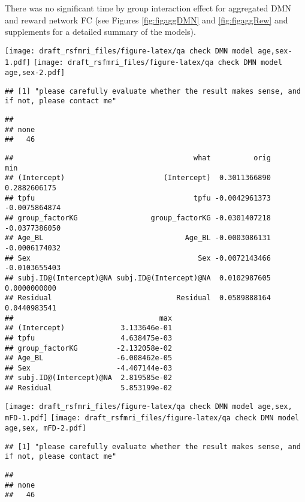 \documentclass[
]{article}
\begin{document}
There was no significant time by group interaction effect for aggregated DMN and reward network FC (see Figures \ref{fig:figaggDMN} and \ref{fig:figaggRew} and supplements for a detailed summary of the models).

\texttt{[image: draft\_rsfmri\_files/figure-latex/qa check DMN model age,sex-1.pdf]} \texttt{[image: draft\_rsfmri\_files/figure-latex/qa check DMN model age,sex-2.pdf]}

\begin{verbatim}
## [1] "please carefully evaluate whether the result makes sense, and if not, please contact me"
\end{verbatim}

\begin{verbatim}
## 
## none 
##   46
\end{verbatim}

\begin{verbatim}
##                                          what          orig           min
## (Intercept)                       (Intercept)  0.3011366890  0.2882606175
## tpfu                                     tpfu -0.0042961373 -0.0075864874
## group_factorKG                 group_factorKG -0.0301407218 -0.0377386050
## Age_BL                                 Age_BL -0.0003086131 -0.0006174032
## Sex                                       Sex -0.0072143466 -0.0103655403
## subj.ID@(Intercept)@NA subj.ID@(Intercept)@NA  0.0102987605  0.0000000000
## Residual                             Residual  0.0589888164  0.0440983541
##                                  max
## (Intercept)             3.133646e-01
## tpfu                    4.638475e-03
## group_factorKG         -2.132058e-02
## Age_BL                 -6.008462e-05
## Sex                    -4.407144e-03
## subj.ID@(Intercept)@NA  2.819585e-02
## Residual                5.853199e-02
\end{verbatim}

\texttt{[image: draft\_rsfmri\_files/figure-latex/qa check DMN model age,sex, mFD-1.pdf]} \texttt{[image: draft\_rsfmri\_files/figure-latex/qa check DMN model age,sex, mFD-2.pdf]}

\begin{verbatim}
## [1] "please carefully evaluate whether the result makes sense, and if not, please contact me"
\end{verbatim}

\begin{verbatim}
## 
## none 
##   46
\end{verbatim}
\end{document}
